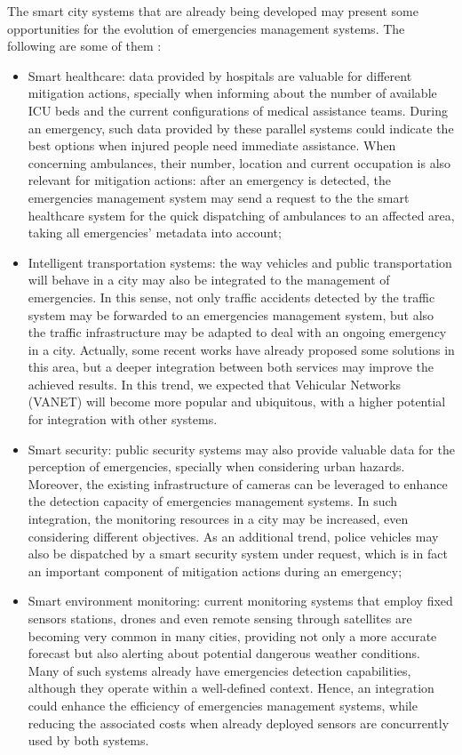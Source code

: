 \begin{refsection}
The smart city systems that are already being developed may present some opportunities for the evolution of emergencies management systems. The following are some of them \cite{citiestransforming}:

\begin{itemize}
    \item Smart healthcare: data provided by hospitals are valuable for different mitigation actions, specially when informing about the number of available ICU beds and the current configurations of medical assistance teams. During an emergency, such data provided by these parallel systems could indicate the best options when injured people need immediate assistance. When concerning ambulances, their number, location and current occupation is also relevant for mitigation actions: after an emergency is detected, the emergencies management system may send a request to the the smart healthcare system for the quick dispatching of ambulances to an affected area, taking all emergencies' metadata into account;
    
    \item Intelligent transportation systems: the way vehicles and public transportation will behave in a city may also be integrated to the management of emergencies. In this sense, not only traffic accidents detected by the traffic system may be forwarded to an emergencies management system, but also the traffic infrastructure may be adapted to deal with an ongoing emergency in a city. Actually, some recent works have already proposed some solutions in this area, but a deeper integration between both services may improve the achieved results. In this trend, we expected that Vehicular Networks (VANET) will become more popular and ubiquitous, with a higher potential for integration with other systems.

    \item Smart security: public security systems may also provide valuable data for the perception of emergencies, specially when considering urban hazards. Moreover, the existing infrastructure of cameras can be leveraged to enhance the detection capacity of emergencies management systems. In such integration, the monitoring resources in a city may be increased, even considering different objectives. As an additional trend, police vehicles may also be dispatched by a smart security system under request, which is in fact an important component of mitigation actions during an emergency;
    
    \item Smart environment monitoring: current monitoring systems that employ fixed sensors stations, drones and even remote sensing through satellites are becoming very common in many cities, providing not only a more accurate forecast but also alerting about potential dangerous weather conditions. Many of such systems already have emergencies detection capabilities, although they operate within a well-defined context. Hence, an integration could enhance the efficiency of emergencies management systems, while reducing the associated costs when already deployed sensors are concurrently used by both systems.
\end{itemize}


\end{refsection}
